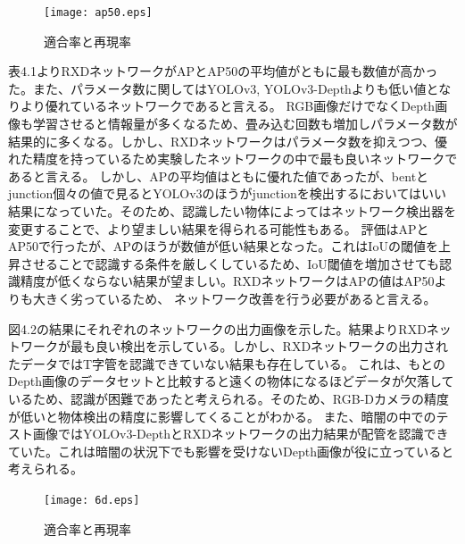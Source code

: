 \begin{figure}[htbt]
	\centering
	 \texttt{[image: ap50.eps]}
	 \caption{適合率と再現率}
	 \label{fig:f2}
\end{figure}

表4.1よりRXDネットワークがAPとAP50の平均値がともに最も数値が高かった。また、パラメータ数に関してはYOLOv3, YOLOv3-Depthよりも低い値となりより優れているネットワークであると言える。
RGB画像だけでなくDepth画像も学習させると情報量が多くなるため、畳み込む回数も増加しパラメータ数が結果的に多くなる。しかし、RXDネットワークはパラメータ数を抑えつつ、優れた精度を持っているため実験したネットワークの中で最も良いネットワークであると言える。
しかし、APの平均値はともに優れた値であったが、bentとjunction個々の値で見るとYOLOv3のほうがjunctionを検出するにおいてはいい結果になっていた。そのため、認識したい物体によってはネットワーク検出器を変更することで、より望ましい結果を得られる可能性もある。
評価はAPとAP50で行ったが、APのほうが数値が低い結果となった。これはIoUの閾値を上昇させることで認識する条件を厳しくしているため、IoU閾値を増加させても認識精度が低くならない結果が望ましい。RXDネットワークはAPの値はAP50よりも大きく劣っているため、
ネットワーク改善を行う必要があると言える。


\begin{table}[htbp]
\centering
\caption{テスト画像を用いた検出結果}
\end{table}
図4.2の結果にそれぞれのネットワークの出力画像を示した。結果よりRXDネットワークが最も良い検出を示している。しかし、RXDネットワークの出力されたデータではT字管を認識できていない結果も存在している。
これは、もとのDepth画像のデータセットと比較すると遠くの物体になるほどデータが欠落しているため、認識が困難であったと考えられる。そのため、RGB-Dカメラの精度が低いと物体検出の精度に影響してくることがわかる。
また、暗闇の中でのテスト画像ではYOLOv3-DepthとRXDネットワークの出力結果が配管を認識できていた。これは暗闇の状況下でも影響を受けないDepth画像が役に立っていると考えられる。

\begin{figure}[htbt]
	\centering
	 \texttt{[image: 6d.eps]}
	 \caption{適合率と再現率}
	 \label{fig:f2}
\end{figure}


